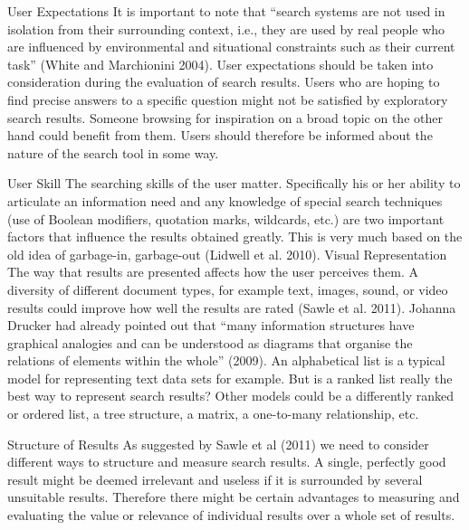 \begin{leftbar}
User Expectations  It is important to note that ``search systems are not used in isolation from their surrounding context, i.e., they are used by real people who are influenced by environmental and situational constraints such as their current task'' (White and Marchionini 2004). User expectations should be taken into consideration during the evaluation of search results. Users who are hoping to find precise answers to a specific question might not be satisfied by exploratory search results. Someone browsing for inspiration on a broad topic on the other hand could benefit from them. Users should therefore be informed about the nature of the search tool in some way.
\end{leftbar}

\begin{leftbar}
User Skill   The searching skills of the user matter. Specifically his or her ability to articulate an information need and any knowledge of special search techniques (use of Boolean modifiers, quotation marks, wildcards, etc.) are two important factors that influence the results obtained greatly. This is very much based on the old idea of garbage-in, garbage-out (Lidwell et al. 2010).
Visual Representation   The way that results are presented affects how the user perceives them. A diversity of different document types, for example text, images, sound, or video results could improve how well the results are rated (Sawle et al. 2011). Johanna Drucker had already pointed out that ``many information structures have graphical analogies and can be understood as diagrams that organise the relations of elements within the whole'' (2009). An alphabetical list is a typical model for representing text data sets for example. But is a ranked list really the best way to represent search results? Other models could be a differently ranked or ordered list, a tree structure, a matrix, a one-to-many relationship, etc.
\end{leftbar}

\begin{leftbar}
Structure of Results  As suggested by Sawle et al (2011) we need to consider different ways to structure and measure search results. A single, perfectly good result might be deemed irrelevant and useless if it is surrounded by several unsuitable results. Therefore there might be certain advantages to measuring and evaluating the value or relevance of individual results over a whole set of results.
\end{leftbar}


